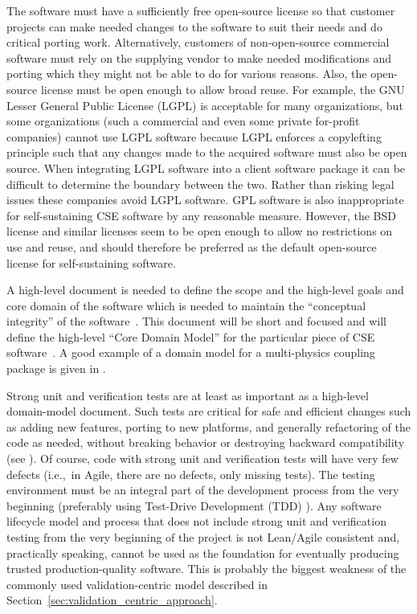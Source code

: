 \documentclass[11pt]{SANDreport}
\begin{document}
The software must have a sufficiently free open-source license so that customer projects can make needed changes to the software to suit their needs and do critical porting work.  Alternatively, customers of non-open-source commercial software must rely on the supplying vendor to make needed modifications and porting which they might not be able to do for various reasons.  Also, the open-source license must be open enough to allow broad reuse.  For example, the GNU Lesser General Public License (LGPL) is acceptable for many organizations, but some organizations (such a commercial and even some private for-profit companies) cannot use LGPL software because LGPL enforces a copylefting principle such that any changes made to the acquired software must also be open source.  When integrating LGPL software into a client software package it can be difficult to determine the boundary between the two.  Rather than risking legal issues these companies avoid LGPL software.  GPL software is also inappropriate for self-sustaining CSE software by any reasonable measure.  However, the BSD license and similar licenses seem to be open enough to allow no restrictions on use and reuse, and should therefore be preferred as the default open-source license for self-sustaining software.

A high-level document is needed to define the scope and the high-level goals and core domain of the software which is needed to maintain the ``conceptual integrity'' of the software~\cite{MythicalManMonth95}. This document will be short and focused and will define the high-level ``Core Domain Model'' for the particular piece of CSE software~\cite{DomainDrivenDesign}.  A good example of a domain model for a multi-physics coupling package is given in {}\cite{LIMEtheory}.

Strong unit and verification tests are at least as important as a high-level domain-model document.  Such tests are critical for safe and efficient changes such as adding new features, porting to new platforms, and generally refactoring of the code as needed, without breaking behavior or destroying backward compatibility (see {}\cite{WorkingEffectivelyWithLegacyCode05}).  Of course, code with strong unit and verification tests will have very few defects (i.e.,\ in Agile, there are no defects, only missing tests).  The testing environment must be an integral part of the development process from the very beginning (preferably using Test-Drive Development (TDD) {}\cite{TDD}).  Any software lifecycle model and process that does not include strong unit and verification testing from the very beginning of the project is not Lean/Agile consistent and, practically speaking, cannot be used as the foundation for eventually producing trusted production-quality software.  This is probably the biggest weakness of the commonly used validation-centric model described in Section~\ref{sec:validation_centric_approach}.
\end{document}

